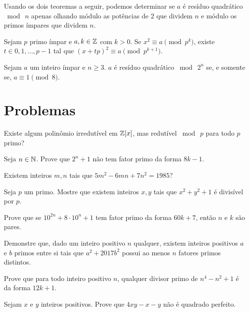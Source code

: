\documentclass[10pt,a4paper]{article}
\newcommand{\tmod}[1]{\bmod{\ #1}}
\begin{document}
	Usando os dois teoremas a seguir, podemos determinar se $a$ é resíduo quadrático $\tmod{n}$ apenas olhando módulo as potências de 2 que dividem $n$ e módulo os primos ímpares que dividem $n$.

	\begin{thm}
		Sejam $p$ primo ímpar e $a, k \in \mathbb{Z}$ com $k > 0$. Se $x^2 \equiv a \pmod{p^k}$, existe $t \in {0, 1, \dots, p-1}$ tal que $(x+tp)^2 \equiv a \pmod{p^{k+1}}$.
	\end{thm}
	\begin{thm}
		Sejam $a$ um inteiro ímpar e $n \ge 3$. $a$ é resíduo quadrático $\tmod{2^n}$ se, e somente se, $a \equiv 1 \pmod{8}$.
	\end{thm}


	\newpage
	\section{Problemas}
	\begin{prob}
		Existe algum polinômio irredutível em $\mathbb{Z}[x]$, mas redutível $\tmod{p}$ para todo $p$ primo?
	\end{prob}
	\begin{prob}
		Seja $n \in \mathbb{N}$. Prove que $2^n + 1$ não tem fator primo da forma $8k - 1$.
	\end{prob}
	\begin{prob}
		Existem inteiros $m, n$ tais que $5m^2 - 6mn + 7n^2 = 1985$?
	\end{prob}
	\begin{prob}
		Seja $p$ um primo. Mostre que existem inteiros $x, y$ tais que $x^2 + y^2 + 1$ é divisível por $p$.
	\end{prob}
	\begin{prob}[OBM]
		Prove que se $10^{2n} + 8 \cdot 10^n + 1$ tem fator primo da forma $60k + 7$, então $n$ e $k$ são pares.
	\end{prob}
	\begin{prob}[OBM]
		Demonstre que, dado um inteiro positivo $n$ qualquer, existem inteiros positivos $a$ e $b$ primos entre si tais que $a^2 + 2017b^2$ possui ao menos $n$ fatores primos distintos.
	\end{prob}
	\begin{prob}
		Prove que para todo inteiro positivo $n$, qualquer divisor primo de $n^4 - n^2 + 1$ é da forma $12k + 1$.
	\end{prob}
	\begin{prob}
		Sejam $x$ e $y$ inteiros positivos. Prove que $4xy - x - y$ não é quadrado perfeito.
	\end{prob}
\end{document}

